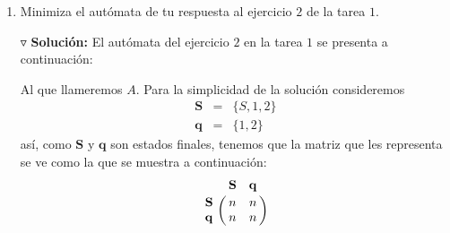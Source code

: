 \documentclass{article}
\begin{document}
\begin{enumerate}
\begin{proof}
    En todos los casos se obvia que la demostración para $\mathbf{a} = \lambda$ [cadena vacía] es por vacuidad.
    
    De los analisis anteriores (tanto por Teo. del Bombeo como del Teo. de Myhill-Nerode) concluimos que
    \[
    \therefore\; \{\mathbf{a} \in \{a, b, c\}^{*}\; |\; \text{la longitud de $\mathbf{a}$
      es el cuadrado de un natural.}\} \text{ \textbf{NO} es regular}.
    \]
  \end{proof}
\item Minimiza el autómata de tu respuesta al ejercicio $2$ de la tarea $1$.
  
    $\triangledown$ \textbf{Solución:}
    El autómata del ejercicio $2$ en la tarea $1$ se presenta a continuación:
    \begin{center}
    \end{center}
    Al que llameremos $A$. Para la simplicidad de la solución consideremos
    \begin{eqnarray*}
      \mathbf{S} &=& \{S,1,2\}\\
      \mathbf{q} &=& \{1,2\}
    \end{eqnarray*}
    así, como $\mathbf{S}$ y $\mathbf{q}$ son estados finales, tenemos
    que la matriz que les representa se ve como la que se muestra a
    continuación:
    \[
    \bordermatrix{
                  & \mathbf{S}     & \mathbf{q} \cr
       \mathbf{S} &     n          &      n     \cr
       \mathbf{q} &     n          &      n     \cr
    }
    \]
    \begin{center}

\end{center}
\end{enumerate}
\end{document}
